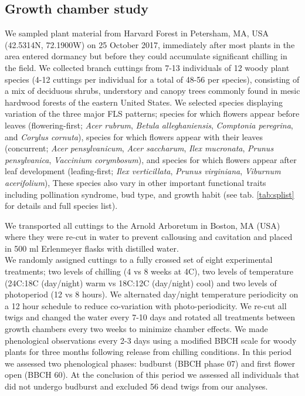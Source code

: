 \documentclass[11pt]{article}\usepackage[]{graphicx}\usepackage[]{color}
\begin{document}
\subsection*{Growth chamber study}

\noindent We sampled plant material from Harvard Forest in Petersham, MA, USA (42.5314\degree N, 72.1900\degree W) on 25 October 2017, immediately after most plants in the area entered dormancy but before they could accumulate significant chilling in the field. We collected branch cuttings from 7-13 individuals of 12 woody plant species (4-12 cuttings per individual for a total of 48-56 per species), consisting of a mix of deciduous shrubs, understory and canopy trees commonly found in mesic hardwood forests of the eastern United States. We selected species displaying variation of the three major FLS patterns; species for which flowers appear before leaves (flowering-first; \textit{Acer rubrum}, \textit{Betula alleghaniensis}, \textit{Comptonia peregrina}, and \textit{Corylus cornuta}), species for which flowers appear with their leaves (concurrent; \textit{Acer pensylvanicum}, \textit{Acer saccharum}, \textit{Ilex mucronata}, \textit{Prunus pensylvanica}, \textit{Vaccinium corymbosum}), and species for which flowers appear after leaf development (leafing-first; \textit{Ilex verticillata}, \textit{Prunus virginiana}, \textit{Viburnum acerifolium}), These species also vary in other important functional traits including pollination syndrome, bud type, and growth habit (see tab. \ref{tab:splist} for details and full species list). 

We transported all cuttings to the Arnold Arboretum in Boston, MA (USA) where they were re-cut in water to prevent callousing and cavitation and placed in 500 ml Erlenmeyer flasks with distilled water.\\ 

\noindent We randomly assigned cuttings to a fully crossed set of eight experimental treatments; two levels of chilling (4 vs 8 weeks at 4\degree C), two levels of temperature (24\degree C:18\degree C (day/night) warm vs 18\degree C:12\degree C (day/night) cool) and two levels of photoperiod (12 vs 8 hours). We alternated day/night temperature periodicity on a 12 hour schedule to reduce co-variation with photo-periodicity. We re-cut all twigs and changed the water every 7-10 days and rotated all treatments between growth chambers every two weeks to minimize chamber effects. We made phenological observations every 2-3 days using a modified BBCH scale for woody plants \citep{Finn2007} for three months following release from chilling conditions. In this period we assessed two phenological phases: budburst (BBCH phase 07) %
and first flower open (BBCH 60). At the conclusion of this period we assessed all individuals that did not undergo budburst and excluded 56 dead twigs from our analyses. 
\end{document}
